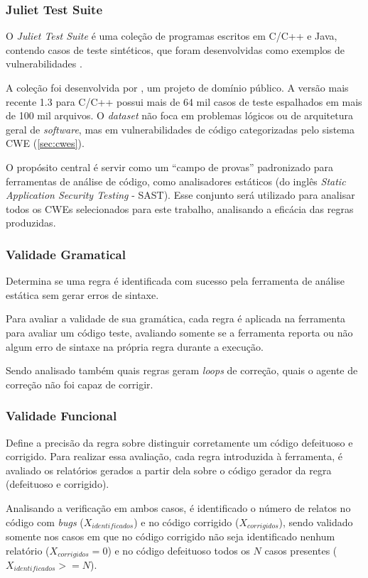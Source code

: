 \documentclass[
    12pt,                %
    openright,           %
    oneside,             %
    a4paper,             %
    english,             %
    brazil               %
]{abntex2}
\begin{document}
\subsubsection{Juliet Test Suite}
\label{sec:juliet}
\par
O \textit{Juliet Test Suite} é uma coleção de programas escritos em C/C++ e Java, contendo casos de teste sintéticos, que foram desenvolvidas como exemplos de vulnerabilidades \cite{nistsard112juliet}.
\par
A coleção foi desenvolvida por , um projeto de domínio público.
A versão mais recente 1.3 para C/C++ possui mais de 64 mil casos de teste espalhados em mais de 100 mil arquivos.
O \textit{dataset} não foca em problemas lógicos ou de arquitetura geral de \textit{software}, mas em vulnerabilidades de código categorizadas pelo sistema CWE (\ref{sec:cwes}).
\par
O propósito central é servir como um ``campo de provas'' padronizado para ferramentas de análise de código, como analisadores estáticos (do inglês \textit{Static Application Security Testing} - SAST).
Esse conjunto será utilizado para analisar todos os CWEs selecionados para este trabalho, analisando a eficácia das regras produzidas.

\subsubsection{Validade Gramatical}
\label{sec:validadegramatica}
\par
Determina se uma regra é identificada com sucesso pela ferramenta de análise estática sem gerar erros de sintaxe.
\par
Para avaliar a validade de sua gramática, cada regra é aplicada na ferramenta para avaliar um código teste, avaliando somente se a ferramenta reporta ou não algum erro de sintaxe na própria regra durante a execução. 
\par
Sendo analisado também quais regras geram \textit{loops} de correção, quais o agente de correção não foi capaz de corrigir.

\subsubsection{Validade Funcional}
\label{sec:validadefuncional}
\par
Define a precisão da regra sobre distinguir corretamente um código defeituoso e corrigido.
Para realizar essa avaliação, cada regra introduzida à ferramenta, é avaliado os relatórios gerados a partir dela sobre o código gerador da regra (defeituoso e corrigido).
\par
Analisando a verificação em ambos casos, é identificado o número de relatos no código com \textit{bugs} ($X_{identificados}$) e no código corrigido ($X_{corrigidos}$), sendo validado somente nos casos em que no código corrigido não seja identificado nenhum relatório ($X_{corrigidos} = 0$) e no código defeituoso todos os $N$ casos presentes ($X_{identificados} >= N$).
\end{document}
